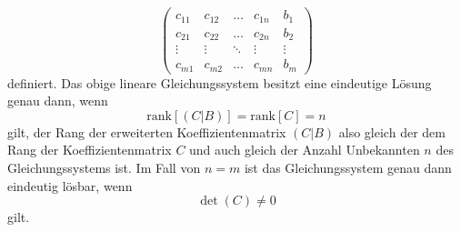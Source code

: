 \documentclass[a4paper,12pt]{article}
\numberwithin{equation}{section}
\begin{document}
\begin{equation}
\begin{pmatrix}
c_{11} & c_{12} & \dots & c_{1n} & b_1 \\
c_{21} & c_{22} & \dots & c_{2n} & b_2\\
\vdots & \vdots & \ddots & \vdots & \vdots \\
c_{m1} & c_{m2} & \dots & c_{mn} & b_m
\end{pmatrix}
\end{equation} definiert. Das obige lineare Gleichungssystem besitzt eine eindeutige Lösung genau dann, wenn \begin{equation}
\textrm{rank}[(C|B)] = \textrm{rank}[C] = n
\end{equation} gilt, der Rang der erweiterten Koeffizientenmatrix $(C|B)$ also gleich der dem Rang der Koeffizientenmatrix $C$ und auch gleich der Anzahl Unbekannten $n$ des Gleichungssystems ist. Im Fall von $n=m$ ist das Gleichungssystem genau dann eindeutig lösbar, wenn \begin{equation}
\det(C) \neq 0
\end{equation} gilt.
\end{document}
